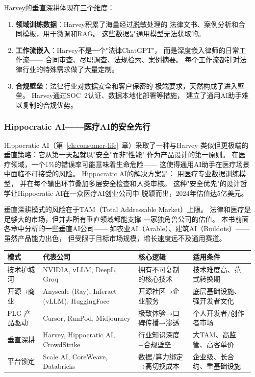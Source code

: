 Harvey的垂直深耕体现在三个维度：
\begin{enumerate}
  \item \textbf{领域训练数据}：Harvey积累了海量经过脱敏处理的
    法律文书、案例分析和合同模板，用于微调和RAG。
    这些数据是通用模型无法获取的。
  \item \textbf{工作流嵌入}：Harvey不是一个"法律ChatGPT"，
    而是深度嵌入律师的日常工作流——
    合同审查、尽职调查、法规检索、案例摘要。
    每个工作流都针对法律行业的特殊需求做了大量定制。
  \item \textbf{合规壁垒}：法律行业对数据安全和客户保密的
    极端要求，天然构成了进入壁垒。
    Harvey通过SOC~2认证、数据本地化部署等措施，
    建立了通用AI助手难以复制的合规优势。
\end{enumerate}

\subsubsection{Hippocratic AI——医疗AI的安全先行}
Hippocratic AI（第~\ref{ch:consumer-life}~章）采取了一种与Harvey
类似但更极端的垂直策略：它从第一天起就以"安全"而非"性能"
作为产品设计的第一原则。
在医疗领域，一个1\%的错误率可能意味着生命危险——
这使得通用AI助手在医疗场景中面临不可接受的风险。
Hippocratic AI的解决方案是：
用医疗专业数据训练模型，
并在每个输出环节叠加多层安全检查和人类审核。
这种"安全优先"的设计哲学让Hippocratic AI在一众医疗AI创业公司中
脱颖而出，2024年估值达5亿美元。

垂直深耕模式的风险在于TAM（Total Addressable Market）上限。
法律和医疗是足够大的市场，但并非所有垂直领域都能支撑
一家独角兽公司的估值。
本书前面各章中分析的一些垂直AI公司——
如农业AI（Arable）、建筑AI（Buildots）——
虽然产品能力出色，
但受限于目标市场规模，增长速度远不及通用赛道。

\begin{corebox}
\small
\begin{tabularx}{\textwidth}{l X X X}
\toprule
\rowcolor{figLightGray}
\textbf{模式} & \textbf{代表公司} & \textbf{核心逻辑} & \textbf{适用条件} \\
\midrule
技术护城河
  & NVIDIA, vLLM, DeepL, Groq
  & 拥有不可复制的核心技术
  & 技术难度高、范式转换期 \\
\addlinespace
开源→商业
  & Anyscale (Ray), Inferact (vLLM), HuggingFace
  & 开源社区→企业服务
  & 底层基础设施、强开发者文化 \\
\addlinespace
PLG 产品驱动
  & Cursor, RunPod, Midjourney
  & 极致体验→口碑传播→渗透
  & 个人开发者/创作者市场 \\
\addlinespace
垂直深耕
  & Harvey, Hippocratic AI, CrowdStrike
  & 行业知识深度+合规壁垒
  & 大TAM、高监管、高客单价 \\
\addlinespace
平台锁定
  & Scale AI, CoreWeave, Databricks
  & 数据/算力绑定→高切换成本
  & 企业级、长合约、重基础设施 \\
\bottomrule
\end{tabularx}
\end{corebox}


